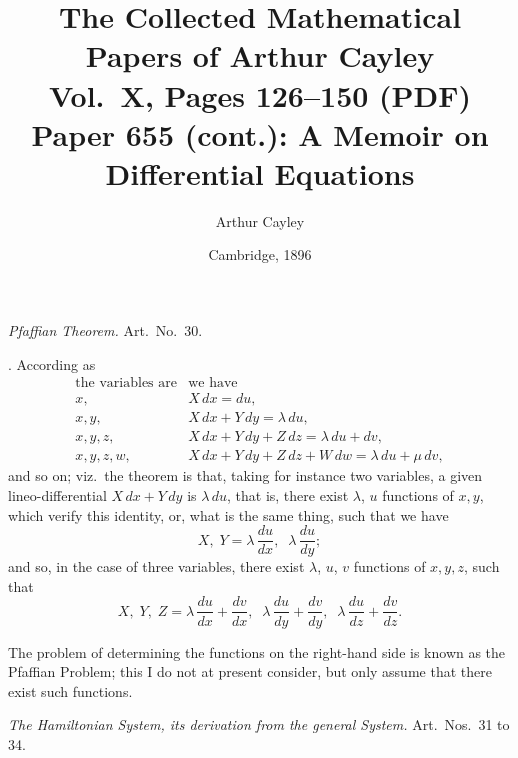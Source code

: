 \documentclass[11pt,a4paper]{article}
\title{The Collected Mathematical Papers of Arthur Cayley\\[6pt]
\large Vol.~X, Pages 126--150 (PDF) \\[4pt]
\normalsize Paper 655 (cont.): A Memoir on Differential Equations}
\author{Arthur Cayley}
\date{Cambridge, 1896}
\begin{document}
\maketitle
\thispagestyle{fancy}

\setcounter{page}{126}



\begin{center}
\emph{Pfaffian Theorem.} Art.\ No.\ 30.
\end{center}

\medskip

. According as
\[
\begin{array}{ll}
\text{the variables are} & \text{we have} \\[2pt]
x, & X\,dx = du, \\
x, y, & X\,dx + Y\,dy = \lambda\,du, \\
x, y, z, & X\,dx + Y\,dy + Z\,dz = \lambda\,du + d v, \\
x, y, z, w, & X\,dx + Y\,dy + Z\,dz + W\,dw = \lambda\,du + \mu\,dv,
\end{array}
\]
and so on; viz.\ the theorem is that, taking for instance two variables, a given lineo-differential $X\,dx + Y\,dy$ is $\lambda\,du$, that is, there exist $\lambda$, $u$ functions of $x, y$, which verify this identity, or, what is the same thing, such that we have
\[
X, \; Y = \lambda\,\frac{du}{dx}, \;\; \lambda\,\frac{du}{dy};
\]
and so, in the case of three variables, there exist $\lambda$, $u$, $v$ functions of $x, y, z$, such that
\[
X, \; Y, \; Z = \lambda\,\frac{du}{dx} + \frac{dv}{dx}, \;\; \lambda\,\frac{du}{dy} + \frac{dv}{dy}, \;\; \lambda\,\frac{du}{dz} + \frac{dv}{dz}.
\]

The problem of determining the functions on the right-hand side is known as the Pfaffian Problem; this I do not at present consider, but only assume that there exist such functions.

\bigskip

\begin{center}
\emph{The Hamiltonian System, its derivation from the general System.} Art.\ Nos.\ 31 to 34.
\end{center}

\medskip
\end{document}

